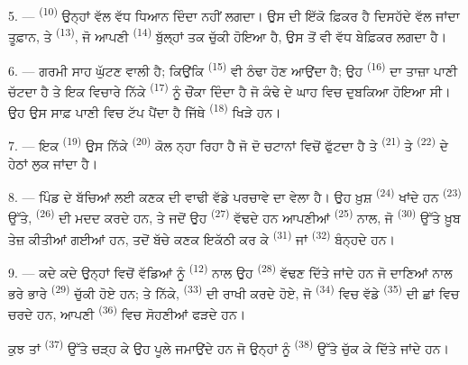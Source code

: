 \VUsaut{5.0mm}
\VUsaut{3.4mm}

5. ---  \textsuperscript{(10)} ਉਨ੍ਹਾਂ ਵੱਲ ਵੱਧ ਧਿਆਨ ਦਿੰਦਾ ਨਹੀਂ ਲਗਦਾ।
ਉਸ ਦੀ ਇੱਕੋ ਫ਼ਿਕਰ ਹੈ ਦਿਸਹੱਦੇ ਵੱਲ ਜਾਂਦਾ ਤੂਫ਼ਾਨ, ਤੇ 
\textsuperscript{(13)}, ਜੋ ਆਪਣੀ  \textsuperscript{(14)} ਬੁੱਲ੍ਹਾਂ ਤਕ
ਚੁੱਕੀ ਹੋਇਆ ਹੈ, ਉਸ ਤੋਂ ਵੀ ਵੱਧ ਬੇਫ਼ਿਕਰ ਲਗਦਾ ਹੈ।

6. --- ਗਰਮੀ ਸਾਹ ਘੁੱਟਣ ਵਾਲੀ ਹੈ; ਕਿਉਂਕਿ  \textsuperscript{(15)} ਵੀ
ਠੰਢਾ ਹੋਣ ਆਉਂਦਾ ਹੈ; ਉਹ  \textsuperscript{(16)} ਦਾ ਤਾਜ਼ਾ ਪਾਣੀ ਚੱਟਦਾ ਹੈ
ਤੇ ਇਕ ਵਿਚਾਰੇ ਨਿੱਕੇ  \textsuperscript{(17)} ਨੂੰ ਚੌਂਕਾ ਦਿੰਦਾ ਹੈ ਜੋ ਕੰਢੇ ਦੇ
ਘਾਹ ਵਿਚ ਦੁਬਕਿਆ ਹੋਇਆ ਸੀ। ਉਹ ਉਸ ਸਾਫ਼ ਪਾਣੀ ਵਿਚ ਟੱਪ ਪੈਂਦਾ ਹੈ ਜਿੱਥੇ 
\textsuperscript{(18)} ਖਿੜੇ ਹਨ।

7. --- ਇਕ  \textsuperscript{(19)} ਉਸ ਨਿੱਕੇ 
\textsuperscript{(20)} ਕੋਲ ਨ੍ਹਾ ਰਿਹਾ ਹੈ ਜੋ ਦੋ ਚਟਾਨਾਂ ਵਿਚੋਂ ਫੁੱਟਦਾ ਹੈ ਤੇ
 \textsuperscript{(21)} ਤੇ  \textsuperscript{(22)} ਦੇ ਹੇਠਾਂ ਲੁਕ ਜਾਂਦਾ ਹੈ।

\VUsaut{5.0mm}
\VUsaut{3.4mm}

8. --- ਪਿੰਡ ਦੇ ਬੱਚਿਆਂ ਲਈ ਕਣਕ ਦੀ ਵਾਢੀ ਵੱਡੇ ਪਰਚਾਵੇ ਦਾ ਵੇਲਾ ਹੈ। ਉਹ ਖ਼ੁਸ਼
 \textsuperscript{(24)} ਖਾਂਦੇ ਹਨ 
\textsuperscript{(23)} ਉੱਤੇ,  \textsuperscript{(26)} ਦੀ ਮਦਦ
ਕਰਦੇ ਹਨ, ਤੇ ਜਦੋਂ ਉਹ  \textsuperscript{(27)} ਵੱਢਦੇ ਹਨ ਆਪਣੀਆਂ
 \textsuperscript{(25)} ਨਾਲ, ਜੋ  \textsuperscript{(30)}
ਉੱਤੇ ਖ਼ੂਬ ਤੇਜ਼ ਕੀਤੀਆਂ ਗਈਆਂ ਹਨ, ਤਦੋਂ ਬੱਚੇ ਕਣਕ ਇਕੱਠੀ ਕਰ ਕੇ 
\textsuperscript{(31)} ਜਾਂ  \textsuperscript{(32)} ਬੰਨ੍ਹਦੇ
ਹਨ।

9. --- ਕਦੇ ਕਦੇ ਉਨ੍ਹਾਂ ਵਿਚੋਂ ਵੱਡਿਆਂ ਨੂੰ  \textsuperscript{(12)} ਨਾਲ ਉਹ
 \textsuperscript{(28)} ਵੱਢਣ ਦਿੱਤੇ ਜਾਂਦੇ ਹਨ ਜੋ ਦਾਣਿਆਂ ਨਾਲ ਭਰੇ
ਭਾਰੇ  \textsuperscript{(29)} ਚੁੱਕੀ ਹੋਏ ਹਨ; ਤੇ ਨਿੱਕੇ,
 \textsuperscript{(33)} ਦੀ ਰਾਖੀ ਕਰਦੇ ਹੋਏ, ਜੋ 
\textsuperscript{(34)} ਵਿਚ ਵੱਡੇ  \textsuperscript{(35)} ਦੀ ਛਾਂ
ਵਿਚ ਚਰਦੇ ਹਨ, ਆਪਣੀ  \textsuperscript{(36)} ਵਿਚ ਸੋਹਣੀਆਂ
 ਫੜਦੇ ਹਨ।

ਕੁਝ ਤਾਂ  \textsuperscript{(37)} ਉੱਤੇ ਚੜ੍ਹ ਕੇ ਉਹ ਪੂਲੇ ਜਮਾਉਂਦੇ ਹਨ ਜੋ
ਉਨ੍ਹਾਂ ਨੂੰ  \textsuperscript{(38)} ਉੱਤੇ ਚੁੱਕ ਕੇ ਦਿੱਤੇ ਜਾਂਦੇ ਹਨ।

